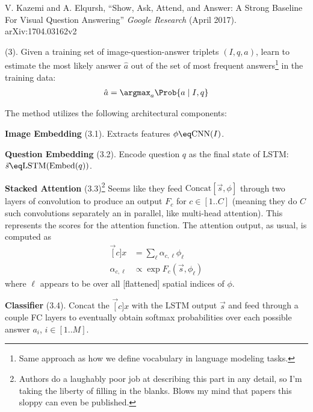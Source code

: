 \documentclass[11pt]{article}
\begin{document}
\vspace{-1.5em}
{\footnotesize V. Kazemi and A. Elqursh, ``Show, Ask, Attend, and Answer: A Strong Baseline For Visual Question Answering'' \textit{Google Research} (April 2017).  arXiv:1704.03162v2}

 (3). Given a training set of image-question-answer triplets $(I, q, a)$, learn to estimate the most likely answer $\hat a$ out of the set of most frequent answers\footnote{Same approach as how we define vocabulary in language modeling tasks.} in the training data:
\begin{align}
\hat a = \argmax_{a} \Prob{a \mid I, q}
\end{align}

The method utilizes the following architectural components:
\begin{compactitem}
	\item \textbf{Image Embedding} (3.1). Extracts features $\phi \eq \text{CNN}(I)$. 
	
	\item \textbf{Question Embedding} (3.2). Encode question $q$ as the final state of LSTM: $\vec s \eq \text{LSTM}(\text{Embed}(q))$. 
	
	\item \textbf{Stacked Attention} (3.3)\footnote{Authors do a laughably poor job at describing this part in any detail, so I'm taking the liberty of filling in the blanks. Blows my mind that papers this sloppy can even be published.} Seems like they feed $\text{Concat}[\vec s, \phi]$ through two layers of convolution to produce an output $F_c$ for $c \in [1..C]$ (meaning they do $C$ such convolutions separately an in parallel, like multi-head attention). This represents the scores for the attention function. The attention output, as usual, is computed as 
	\begin{align}
	\vec[c]{x} &= \sum_{\ell} \alpha_{c, \ell} \phi_{\ell} \\
	\alpha_{c, \ell} &\propto \exp F_c(\vec s, \phi_{\ell})
	\end{align}
	where $\ell$ appears to be over all [flattened] spatial indices of $\phi$. 
	
	\item \textbf{Classifier} (3.4). Concat the  $\vec[c]{x}$ with the LSTM output $\vec s$ and feed through a couple FC layers to eventually obtain softmax probabilities over each possible answer $a_i$, $i \in [1..M]$. 
\end{compactitem}
\end{document}

